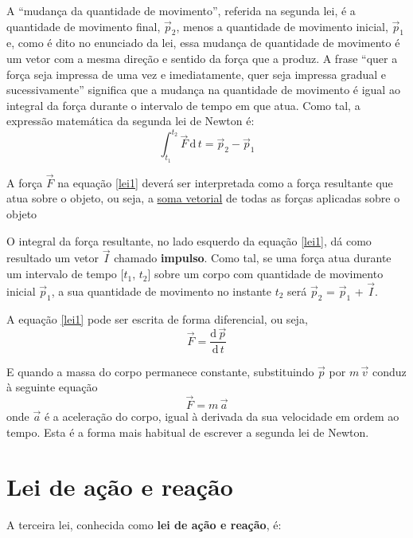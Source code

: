 \documentclass[a4paper,12pt,twosided]{report}
\begin{document}
A ``mudança da quantidade de movimento'', referida na segunda lei, é a
quantidade de movimento final, $\vec{p}_2$, menos a quantidade de movimento
inicial, $\vec{p}_1$ e, como é dito no enunciado da lei, essa mudança de
quantidade de movimento é um vetor com a mesma direção e sentido da
força que a produz. A frase ``quer a força seja impressa de uma vez e
imediatamente, quer seja impressa gradual e sucessivamente'' significa que
a mudança na quantidade de movimento é igual ao integral da força
durante o intervalo de tempo em que atua. Como tal, a expressão
matemática da segunda lei de Newton é:
\begin{equation}
\label{lei1}
 \int_{t_1}^{t_2}\vec{F}\,\mathrm{d}\,t = \vec{p}_2 - \vec{p}_1
\end{equation}

A força $\vec{F}$ na equação \ref{lei1} deverá ser interpretada como a
força resultante que atua sobre o objeto, ou seja, a
\href{https://villate.org/dinamica/cinematica_vetorial.html#sec-2.3}{soma
  vetorial} de todas as forças aplicadas sobre o objeto

O integral da força resultante, no lado esquerdo da equação
\ref{lei1}, dá como resultado um vetor $\vec{I}$ chamado
\textbf{impulso}. Como tal, se uma força atua durante um intervalo de
tempo [$t _{1}$, $t _{2}$] sobre um corpo com quantidade de movimento
inicial $\vec{p}_1$, a sua quantidade de movimento no instante
$t _{2}$ será $\vec{p} _{2}$ = $\vec{p} _{1}$ + $\vec{I}$.

A equação \ref{lei1} pode ser escrita de forma diferencial, ou seja,
\begin{equation}
\vec{F} = \frac{\mathrm{d}\,\vec{p}}{\mathrm{d}\,t}
\end{equation}

E quando a massa do corpo permanece constante, substituindo $\vec{p}$ por
$m\,\vec{v}$ conduz à seguinte equação
\begin{equation}
\vec{F} = m\,\vec{a}
\end{equation}
onde $\vec{a}$ é a aceleração do corpo, igual à derivada da sua
velocidade em ordem ao tempo. Esta é a forma mais habitual de escrever
a segunda lei de Newton.

\section{Lei de ação e reação}

A terceira lei, conhecida como \textbf{lei de ação e reação}, é:
\end{document}
